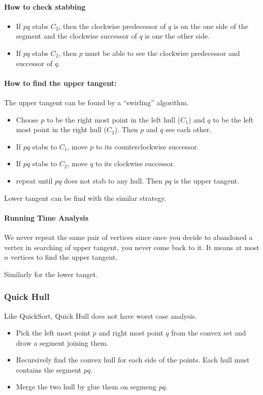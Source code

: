 \paragraph{How to check stabbing}
\begin{itemize}
\item If $pq$ stabs $C_2$, then the clockwise predecessor of $q$ 
is on the one side of the segment and the clockwise successor of $q$ is one the 
other side.
\item If $pq$ stabs $C_2$, then $p$ must be able to see the clockwise 
predecessor and successor of $q$.
\end{itemize}

\paragraph{How to find the upper tangent:}
The upper tangent can be found by a ``swirling'' algorithm.
\begin{itemize}
\item Choose $p$ to be the right most point in the left hull ($C_1$) and 
$q$ to be the left most point in the right hull ($C_2$). Then $p$ and $q$ see 
each other. 
\item If $pq$ stabs to $C_1$, move $p$ to its counterclockwise successor.
\item If $pq$ stabs to $C_2$, move $q$ to its clockwise successor.
\item repeat until $pq$ does not stab to any hull. Then $pq$ is the upper 
tangent.
\end{itemize}

Lower tangent can be find with the similar strategy.

\paragraph{Running Time Analysis}
We never repeat the same pair of vertices since once you decide to abandoned a 
vertex in searching of upper tangent, you never come back to it. It means at 
most $n$ vertices to find the upper tangent.

Similarly for the lower tanget.

\subsubsection{Quick Hull}
Like QuickSort, Quick Hull does not have worst case analysis.
\begin{itemize}
\item Pick the left most point $p$ and right most point $q$ from the convex set 
and draw a segment joining them.
\item Recursively find the convex hull for each side of the points. Each hull 
must contains the segment $pq$.
\item Merge the two hull by glue them on segmeng $pq$.
\end{itemize}

